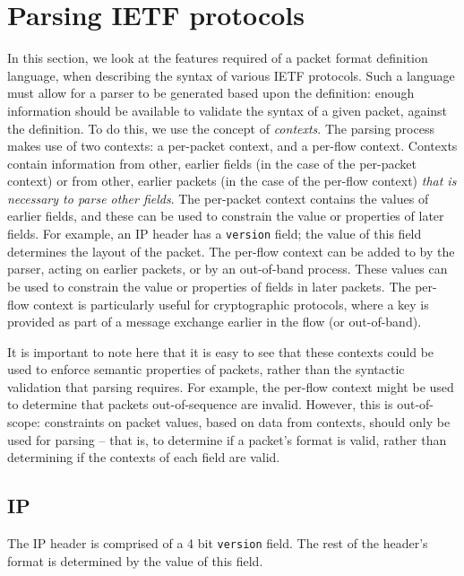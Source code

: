 \documentclass[10pt]{article}
\begin{document}

\section{Parsing IETF protocols}

In this section, we look at the features required of a packet format definition language,
when describing the syntax of various IETF protocols. Such a language must allow for a
parser to be generated based upon the definition: enough information should be available
to validate the syntax of a given packet, against the definition. To do this, we use the
concept of \emph{contexts}. The parsing process makes use of two contexts: a per-packet
context, and a per-flow context. Contexts contain information from other, earlier fields
(in the case of the per-packet context) or from other, earlier packets (in the case of the
per-flow context) \emph{that is necessary to parse other fields}. The per-packet context
contains the values of earlier fields, and these can be used to constrain the value or
properties of later fields. For example, an IP header has a \texttt{version} field; the
value of this field determines the layout of the packet. The per-flow context can be
added to by the parser, acting on earlier packets, or by an out-of-band process. These
values can be used to constrain the value or properties of fields in later packets. The
per-flow context is particularly useful for cryptographic protocols, where a key is
provided as part of a message exchange earlier in the flow (or out-of-band).

It is important to note here that it is easy to see that these contexts could be used to
enforce semantic properties of packets, rather than the syntactic validation that parsing
requires. For example, the per-flow context might be used to determine that packets
out-of-sequence are invalid. However, this is out-of-scope: constraints on packet values,
based on data from contexts, should only be used for parsing -- that is, to determine if
a packet's format is valid, rather than determining if the contexts of each field are
valid.

\subsection{IP}

The IP header is comprised of a 4 bit \texttt{version} field. The rest of the header's
format is determined by the value of this field.
\end{document}
